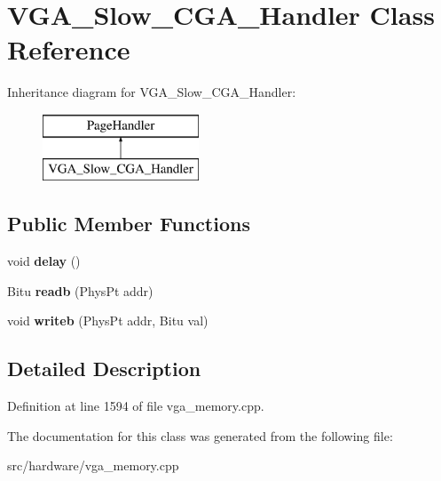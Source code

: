 \hypertarget{classVGA__Slow__CGA__Handler}{\section{V\-G\-A\-\_\-\-Slow\-\_\-\-C\-G\-A\-\_\-\-Handler Class Reference}
\label{classVGA__Slow__CGA__Handler}
}
Inheritance diagram for V\-G\-A\-\_\-\-Slow\-\_\-\-C\-G\-A\-\_\-\-Handler\-:\begin{figure}[H]
\begin{center}
\leavevmode
\includegraphics[height=2.000000cm]{classVGA__Slow__CGA__Handler}
\end{center}
\end{figure}
\subsection*{Public Member Functions}
\begin{DoxyCompactItemize}
\item 
\hypertarget{classVGA__Slow__CGA__Handler_af8dd584b1fbb765acffe039b47f21181}{void {\bfseries delay} ()}\label{classVGA__Slow__CGA__Handler_af8dd584b1fbb765acffe039b47f21181}

\item 
\hypertarget{classVGA__Slow__CGA__Handler_a0724a16ab5641b5436d5505a81438d47}{Bitu {\bfseries readb} (Phys\-Pt addr)}\label{classVGA__Slow__CGA__Handler_a0724a16ab5641b5436d5505a81438d47}

\item 
\hypertarget{classVGA__Slow__CGA__Handler_a26591aafbb6125366d6e5607ae330077}{void {\bfseries writeb} (Phys\-Pt addr, Bitu val)}\label{classVGA__Slow__CGA__Handler_a26591aafbb6125366d6e5607ae330077}

\end{DoxyCompactItemize}


\subsection{Detailed Description}


Definition at line 1594 of file vga\-\_\-memory.\-cpp.



The documentation for this class was generated from the following file\-:\begin{DoxyCompactItemize}
\item 
src/hardware/vga\-\_\-memory.\-cpp\end{DoxyCompactItemize}
